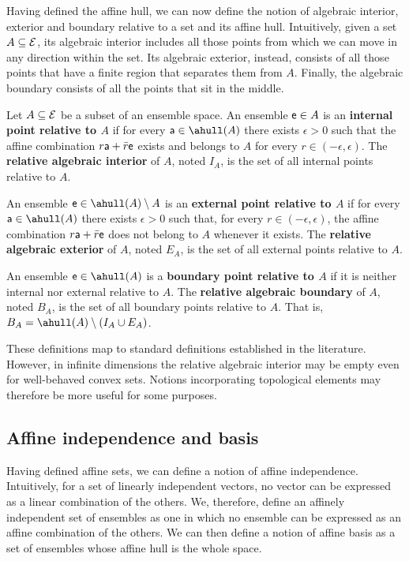 Having defined the affine hull, we can now define the notion of algebraic interior, exterior and boundary relative to a set and its affine hull. Intuitively, given a set $A \subseteq \Ens$, its algebraic interior includes all those points from which we can move in any direction within the set. Its algebraic exterior, instead, consists of all those points that have a finite region that separates them from $A$. Finally, the algebraic boundary consists of all the points that sit in the middle.

\begin{mathSection}
\begin{defn}
	Let $A \subseteq \Ens$ be a subset of an ensemble space. An ensemble $\ens \in A$ is an \textbf{internal point relative to $A$} if for every $\ens[a] \in \ahull(A)$ there exists $\epsilon > 0$ such that the affine combination $r\ens[a] + \bar{r}\ens$ exists and belongs to $A$ for every $r \in (-\epsilon,\epsilon)$. The \textbf{relative algebraic interior} of $A$, noted $I_A$, is the set of all internal points relative to $A$.
	
	An ensemble $\ens \in \ahull(A)\setminus A$ is an \textbf{external point relative to $A$} if for every $\ens[a] \in \ahull(A)$ there exists $\epsilon > 0$ such that, for every $r \in (-\epsilon,\epsilon)$, the affine combination $r\ens[a] + \bar{r}\ens$ does not belong to $A$ whenever it exists. The \textbf{relative algebraic exterior} of $A$, noted $E_A$, is the set of all external points relative to $A$.
	
	An ensemble $\ens \in \ahull(A)$ is a \textbf{boundary point relative to $A$} if it is neither internal nor external relative to $A$. The \textbf{relative algebraic boundary} of $A$, noted $B_A$, is the set of all boundary points relative to $A$. That is, $B_A = \ahull(A)\setminus(I_A\cup E_A)$.
\end{defn}
\end{mathSection}

These definitions map to standard definitions established in the literature. However, in infinite dimensions the relative algebraic interior may be empty even for well-behaved convex sets. Notions incorporating topological elements may therefore be more useful for some purposes.

\subsection{Affine independence and basis}

Having defined affine sets, we can define a notion of affine independence. Intuitively, for a set of linearly independent vectors, no vector can be expressed as a linear combination of the others. We, therefore, define an affinely independent set of ensembles as one in which no ensemble can be expressed as an affine combination of the others. We can then define a notion of affine basis as a set of ensembles whose affine hull is the whole space.

